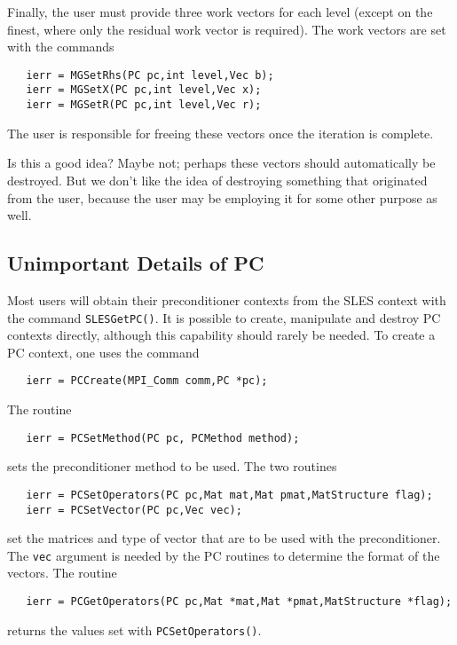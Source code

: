 Finally, the user must provide three work vectors for each level 
(except on the finest, where only the residual work vector is required).
The work vectors are set with the 
commands    
\begin{verbatim}
   ierr = MGSetRhs(PC pc,int level,Vec b);
   ierr = MGSetX(PC pc,int level,Vec x);
   ierr = MGSetR(PC pc,int level,Vec r);
\end{verbatim}
The user is responsible for freeing these vectors once the iteration 
is complete.

\begin{design}
Is this a good idea? Maybe not; perhaps these vectors should automatically 
be destroyed. But we don't like the idea of destroying something that 
originated from the user, because the user may be employing it for some 
other purpose as well.
\end{design}

\subsection{Unimportant Details of PC}

Most users will obtain their preconditioner contexts from the SLES
context with the command {\tt SLESGetPC()}. It is possible to create,
manipulate and destroy PC contexts directly, although this capability
should rarely be needed. To create a PC context, one uses the command
\begin{verbatim}
   ierr = PCCreate(MPI_Comm comm,PC *pc);
\end{verbatim}
The routine 
\begin{verbatim}
   ierr = PCSetMethod(PC pc, PCMethod method);
\end{verbatim}
sets the preconditioner method to be used. 
The two routines  
\begin{verbatim}
   ierr = PCSetOperators(PC pc,Mat mat,Mat pmat,MatStructure flag);
   ierr = PCSetVector(PC pc,Vec vec);
\end{verbatim}
set the matrices and type of vector that are to be used with 
the preconditioner.  The {\tt vec} argument is needed by the PC routines 
to determine the format of the vectors. 
The routine 
\begin{verbatim}
   ierr = PCGetOperators(PC pc,Mat *mat,Mat *pmat,MatStructure *flag);
\end{verbatim}
returns the values set with {\tt PCSetOperators()}.

